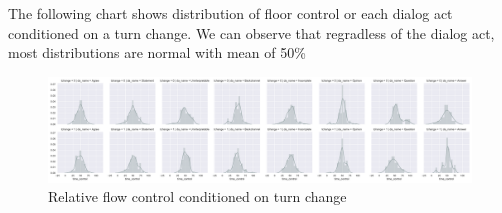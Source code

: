 The following chart shows distribution of floor control or each dialog act conditioned on a turn change. We can observe that regradless of the dialog act, most distributions are normal with mean of 50\%

\begin{figure}
\centering
\includegraphics[width=\textwidth]{../scikitlearn/figures/grid_timecontrol_by_da_name_by_tchange.pdf}
\caption{Relative flow control conditioned on turn change\label{overflow}}
\end{figure}


